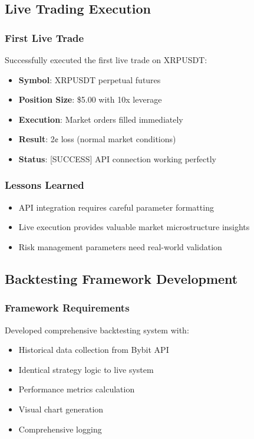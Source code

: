 \documentclass[12pt,a4paper]{article}
\begin{document}
\subsection{Live Trading Execution}

\subsubsection{First Live Trade}
Successfully executed the first live trade on XRPUSDT:

\begin{itemize}
\item \textbf{Symbol}: XRPUSDT perpetual futures
\item \textbf{Position Size}: \$5.00 with 10x leverage
\item \textbf{Execution}: Market orders filled immediately
\item \textbf{Result}: 2¢ loss (normal market conditions)
\item \textbf{Status}: [SUCCESS] API connection working perfectly
\end{itemize}

\subsubsection{Lessons Learned}
\begin{itemize}
\item API integration requires careful parameter formatting
\item Live execution provides valuable market microstructure insights
\item Risk management parameters need real-world validation
\end{itemize}

\subsection{Backtesting Framework Development}

\subsubsection{Framework Requirements}
Developed comprehensive backtesting system with:

\begin{itemize}
\item Historical data collection from Bybit API
\item Identical strategy logic to live system
\item Performance metrics calculation
\item Visual chart generation
\item Comprehensive logging
\end{itemize}
\end{document}
